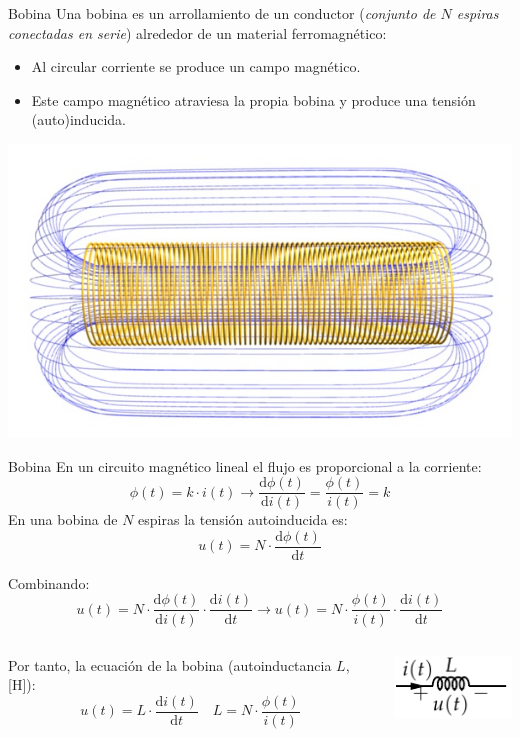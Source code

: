 \documentclass[aspectratio=169, usenames,svgnames,dvipsnames]{beamer}
\begin{document}
\begin{frame}[label={sec:orga3f6dbb}]{Bobina}
Una bobina es un arrollamiento de un conductor (\emph{conjunto de \(N\) espiras conectadas en serie}) alrededor de un material ferromagnético:
\begin{itemize}
\item Al circular corriente se produce un campo magnético.
\item Este campo magnético atraviesa la propia bobina y produce una tensión (auto)inducida.
\end{itemize}
\begin{center}
\includegraphics[height=0.5\textheight]{../figs/Solenoide.jpg}
\end{center}
\end{frame}

\begin{frame}[label={sec:orge2db12b}]{Bobina}
En un circuito magnético lineal el flujo es proporcional a la corriente:
\[
  \phi(t) = k \cdot i(t) \rightarrow   \frac{\mathrm{d}\phi(t)}{\mathrm{d} i(t)} = \frac{\phi(t)}{i(t)} = k
\]
En una bobina de \(N\) espiras la tensión autoinducida es:
\[
u(t) = N \cdot \frac{\mathrm{d}\phi(t)}{\mathrm{d} t}
\]

Combinando:
\[
u(t) = N \cdot \frac{\mathrm{d}\phi(t)}{\mathrm{d} i(t)} \cdot  \frac{\mathrm{d}i(t)}{\mathrm{d} t} \rightarrow u(t) = N \cdot \frac{\phi(t)}{i(t)} \cdot \frac{\mathrm{d}i(t)}{\mathrm{d} t}
\]
\begin{columns}
\begin{column}{0.7\columnwidth}
Por tanto, la ecuación de la bobina (autoinductancia \(L\), [H]):
\[
  \boxed{u(t) = L \cdot \frac{\mathrm{d}i(t)}{\mathrm{d} t}} \quad \boxed{L = N \cdot \frac{\phi(t)}{i(t)}}
\]
\end{column}
\begin{column}{0.3\columnwidth}
\begin{center}
\includegraphics[height=0.2\textheight]{../figs/Bobina.pdf}
\end{center}
\end{column}
\end{columns}
\end{frame}
\end{document}
